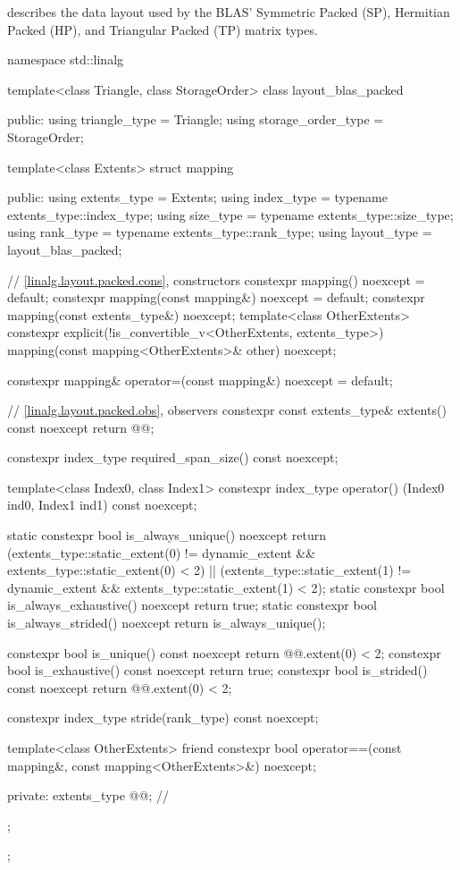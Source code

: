 \pnum
\begin{note}
 describes the data layout used by
the BLAS'
Symmetric Packed (SP), Hermitian Packed (HP), and Triangular Packed (TP)
matrix types.
\end{note}
\begin{codeblock}
namespace std::linalg {
  template<class Triangle, class StorageOrder>
  class layout_blas_packed {
  public:
    using triangle_type = Triangle;
    using storage_order_type = StorageOrder;

    template<class Extents>
    struct mapping {
    public:
      using extents_type = Extents;
      using index_type = typename extents_type::index_type;
      using size_type = typename extents_type::size_type;
      using rank_type = typename extents_type::rank_type;
      using layout_type = layout_blas_packed;

      // \ref{linalg.layout.packed.cons}, constructors
      constexpr mapping() noexcept = default;
      constexpr mapping(const mapping&) noexcept = default;
      constexpr mapping(const extents_type&) noexcept;
      template<class OtherExtents>
        constexpr explicit(!is_convertible_v<OtherExtents, extents_type>)
          mapping(const mapping<OtherExtents>& other) noexcept;

      constexpr mapping& operator=(const mapping&) noexcept = default;

      // \ref{linalg.layout.packed.obs}, observers
      constexpr const extents_type& extents() const noexcept { return @@; }

      constexpr index_type required_span_size() const noexcept;

      template<class Index0, class Index1>
        constexpr index_type operator() (Index0 ind0, Index1 ind1) const noexcept;

      static constexpr bool is_always_unique() noexcept {
        return (extents_type::static_extent(0) != dynamic_extent &&
                extents_type::static_extent(0) < 2) ||
               (extents_type::static_extent(1) != dynamic_extent &&
                extents_type::static_extent(1) < 2);
      }
      static constexpr bool is_always_exhaustive() noexcept { return true; }
      static constexpr bool is_always_strided() noexcept
        { return is_always_unique(); }

      constexpr bool is_unique() const noexcept {
        return @@.extent(0) < 2;
      }
      constexpr bool is_exhaustive() const noexcept { return true; }
      constexpr bool is_strided() const noexcept {
        return @@.extent(0) < 2;
      }

      constexpr index_type stride(rank_type) const noexcept;

      template<class OtherExtents>
        friend constexpr bool operator==(const mapping&, const mapping<OtherExtents>&) noexcept;

    private:
      extents_type @@{};     // \expos
    };
  };
}
\end{codeblock}

